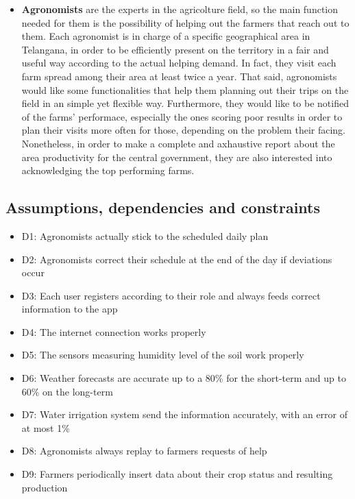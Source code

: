 \documentclass[table, 12pt]{article}
\begin{document}
\begin{itemize}
    \item \textbf{Agronomists} are the experts in the agricolture field, so the main function needed for them is the possibility of helping out the farmers that reach out to them. Each agronomist is in charge of a specific geographical area in Telangana, in order to be efficiently present on the territory in a fair and useful way according to the actual helping demand. In fact, they visit each farm spread among their area at least twice a year. That said, agronomists would like some functionalities that help them planning out their trips on the field in an simple yet flexible way. Furthermore, they would like to be notified of the farms' performace, especially the ones scoring poor results in order to plan their visits more often for those, depending on the problem their facing. Nonetheless, in order to make a complete and axhaustive report about the area productivity for the central government, they are also interested into acknowledging the top performing farms. %
\end{itemize}
\subsection{Assumptions, dependencies and constraints}
\begin{itemize}
    \item D1: Agronomists actually stick to the scheduled daily plan
    \item D2: Agronomists correct their schedule at the end of the day if deviations occur
    \item D3: Each user registers according to their role and always feeds correct information to the app
    \item D4: The internet connection works properly
    \item D5: The sensors measuring humidity level of the soil work properly
    \item D6: Weather forecasts are accurate up to a 80\% for the short-term and up to 60\% on the long-term
    \item D7: Water irrigation system send the information accurately, with an error of at most 1\%
    \item D8: Agronomists always replay to farmers requests of help
    \item D9: Farmers periodically insert data about their crop status and resulting production
\end{itemize}
\end{document}
